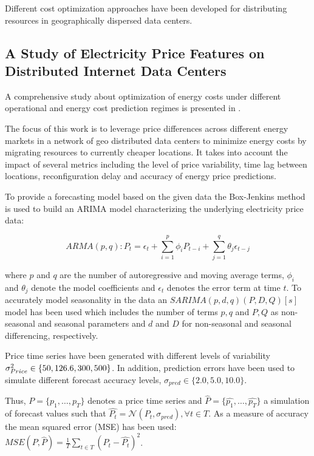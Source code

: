 Different cost optimization approaches have been developed for distributing resources in geographically dispersed data centers. 

\subsection{A Study of Electricity Price Features on Distributed Internet Data Centers}

A comprehensive study about optimization of energy costs under different operational and energy cost prediction regimes is presented in \cite{de2013study}. 

The focus of this work is to leverage price differences across different energy markets in a network of geo distributed data centers to minimize energy costs by migrating resources to currently cheaper locations. It takes into account the impact of several metrics including the level of price variability, time lag between locations, reconfiguration delay and accuracy of energy price predictions. 

To provide a forecasting model based on the given data the Box-Jenkins method is used to build an ARIMA model characterizing the underlying electricity price data:

\[ ARMA(p,q) : P_t = \epsilon_t + \sum_{i=1}^{p}{\phi_i P_{t-i}} + \sum_{j=1}^{q}{\theta_j \epsilon_{t-j}}\] 

where $p$ and $q$ are the number of autoregressive and moving average terms, $\phi_i$ and $\theta_j$ denote the model coefficients and $\epsilon_t$ denotes the error term at time $t$. To accurately model seasonality in the data an $SARIMA(p,d,q)(P,D,Q)[s]$ model has been used which includes the number of terms $p,q$ and $P,Q$ as non-seasonal and seasonal parameters and $d$ and $D$ for non-seasonal and seasonal differencing, respectively. 

Price time series have been generated with different levels of variability $\sigma_{Price}^{2} \in \{50, 126.6, \allowbreak 300, 500\}$. In addition, prediction errors have been used to simulate different forecast accuracy levels, $\sigma_{pred} \in \{2.0, 5.0, 10.0\}$. 

Thus, $P = \{p_1,\ldots,p_T \}$ denotes a price time series and $\hat{P} = \{\hat{p_1},\ldots,\hat{p_T}\}$ a simulation of forecast values such that 
$\hat{P_t} = \mathcal{N}(P_t, \sigma_{pred}), \forall t \in T$. As a measure of accuracy the mean squared error (MSE) has been used: 
$MSE(P,\hat{P}) = \frac{1}{T} \sum_{t \in T}{(P_t - \hat{P_t})^2}$. 

